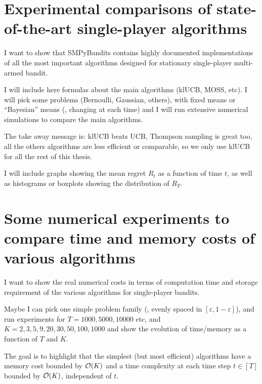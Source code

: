 

\section{Experimental comparisons of state-of-the-art single-player algorithms}
\label{sec:3:reviewSPAlgorithms}

I want to show that SMPyBandits contains highly documented implementations of all the most important algorithms designed for stationary single-player multi-armed bandit.

I will include here formulas about the main algorithms (klUCB, MOSS, etc).
I will pick some problems (Bernoulli, Gaussian, others), with fixed means or ``Bayesian'' means (\ie, changing at each time) and I will run extensive numerical simulations to compare the main algorithms.

The take away message is: klUCB beats UCB, Thompson sampling is great too, all the others algorithms are less efficient or comparable, so we only use klUCB for all the rest of this thesis.

I will include graphs showing the mean regret $R_t$ as a function of time $t$, as well as histograms or boxplots showing the distribution of $R_T$.


\section{Some numerical experiments to compare time and memory costs of various algorithms}
\label{sec:3:timeAndMemoryCosts}

I want to show the real numerical costs in terms of computation time and storage requirement of the various algorithms for single-player bandits.

Maybe I can pick one simple problem family (\eg, evenly spaced in $[\varepsilon,1-\varepsilon]$), and run experiments for $T=1000,5000,10000$ etc, and $K=2,3,5,9,20,30,50,100,1000$ and show the evolution of time/memory as a function of $T$ and $K$.

The goal is to highlight that the simplest (but most efficient) algorithms have a memory cost bounded by $\mathop{}\mathopen{}\mathcal{O}\mathopen{}\left(K\right)$ and a time complexity at each time step $t\in[T]$ bounded by $\mathop{}\mathopen{}\mathcal{O}\mathopen{}\left(K\right)$, independent of $t$.


